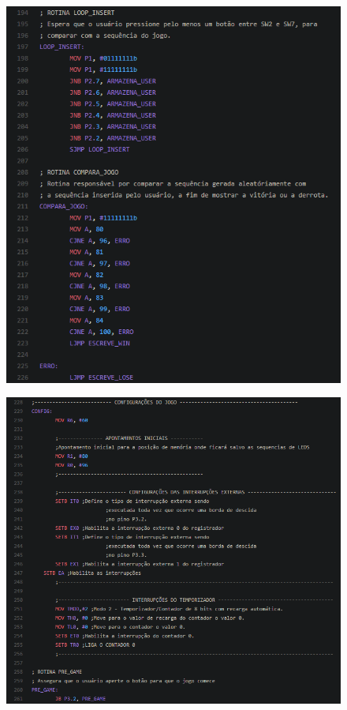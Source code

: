 \documentclass{article}
\begin{document}
\begin{figure}[H]
\hspace*{-1.0in}
\includegraphics[scale=1]{7.PNG}
\end{figure}
\begin{figure}[H]
\hspace*{-1.0in}
\includegraphics[scale=1]{8.PNG}
\end{figure}
\end{document}
